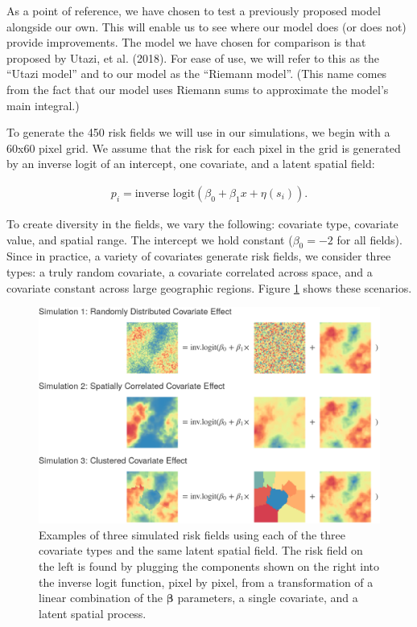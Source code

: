 \documentclass{article}
\begin{document}
As a point of reference, we have chosen to test a previously proposed model alongside our own. This will enable us to see where our model does (or does not) provide improvements. The model we have chosen for comparison is that proposed by Utazi, et al. (2018). For ease of use, we will refer to this as the ``Utazi model'' and to our model as the ``Riemann model''. (This name comes from the fact that our model uses Riemann sums to approximate the model's main integral.)

To generate the 450 risk fields we will use in our simulations, we begin with a 60x60 pixel grid. We assume that the risk for each pixel in the grid is generated by an inverse logit of an intercept, one covariate, and a latent spatial field:

\begin{align}\label{lin}
p_i=\text{inverse logit}(\beta_0+\beta_1x+ \eta(s_i)).
\end{align}

To create diversity in the fields, we vary the following: covariate type, covariate value, and spatial range. The intercept we hold constant ($\beta_0=-2$ for all fields). Since in practice, a variety of covariates generate risk fields, we consider three types: a truly random covariate, a covariate correlated across space, and a covariate constant across large geographic regions. Figure \ref{fig:simPlot} shows these scenarios.

\begin{figure}[ht]
    \centering
    \includegraphics[width=.7\textwidth]{./figures/covariateeffects.png}
    \caption{Examples of three simulated risk fields using each of the three covariate types and the same latent spatial field. The risk field on the left is found by plugging the components shown on the right into the inverse logit function, pixel by pixel, from a transformation of a linear combination of the $\boldsymbol{\beta}$ parameters, a single covariate, and a latent spatial process.}
    \label{fig:simPlot}
\end{figure} 
\end{document}

